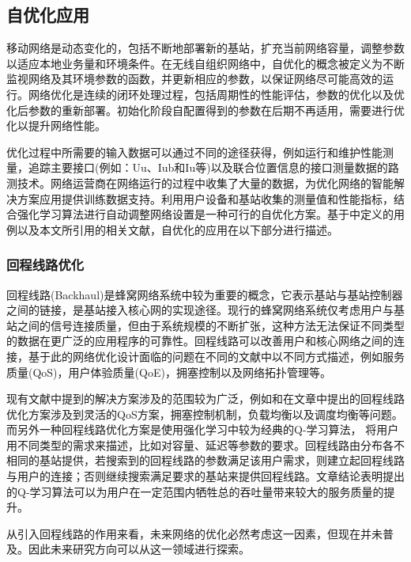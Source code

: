 ﻿\documentclass[11pt,draftclsnofoot,onecolumn,journal,letterpaper]{IEEEtran}
\begin{document}
\subsection{自优化应用}
\label{sec:self-optimization}
移动网络是动态变化的，包括不断地部署新的基站，扩充当前网络容量，调整参数以适应本地业务量和环境条件。在无线自组织网络中，自优化的概念被定义为不断监视网络及其环境参数的函数，并更新相应的参数，以保证网络尽可能高效的运行\cite{Aliu2013}。网络优化是连续的闭环处理过程，包括周期性的性能评估，参数的优化以及优化后参数的重新部署。初始化阶段自配置得到的参数在后期不再适用，需要进行优化以提升网络性能。

优化过程中所需要的输入数据可以通过不同的途径获得，例如运行和维护性能测量，追踪主要接口(例如：Uu、Iub和Iu等)以及联合位置信息的接口测量数据的路测技术。网络运营商在网络运行的过程中收集了大量的数据，为优化网络的智能解决方案应用提供训练数据支持。利用用户设备和基站收集的测量值和性能指标，结合强化学习算法进行自动调整网络设置是一种可行的自优化方案。基于\cite{3gpp.36.902}中定义的用例以及本文所引用的相关文献，自优化的应用在以下部分进行描述。

\subsubsection{回程线路优化}

回程线路(Backhaul)是蜂窝网络系统中较为重要的概念，它表示基站与基站控制器之间的链接，是基站接入核心网的实现途径。现行的蜂窝网络系统仅考虑用户与基站之间的信号连接质量，但由于系统规模的不断扩张，这种方法无法保证不同类型的数据在更广泛的应用程序的可靠性。回程线路可以改善用户和核心网络之间的连接，基于此的网络优化设计面临的问题在不同的文献中以不同方式描述，例如服务质量(QoS)，用户体验质量(QoE)，拥塞控制以及网络拓扑管理等。

现有文献中提到的解决方案涉及的范围较为广泛，例如\cite{Wainio2016}和\cite{Chen2015}在文章中提出的回程线路优化方案涉及到灵活的QoS方案，拥塞控制机制，负载均衡以及调度均衡等问题。而另外一种回程线路优化方案是使用强化学习中较为经典的Q-学习算法，\cite{Jaber2015}\cite{Jaber2016a}\cite{Jaber2016c} 将用户用不同类型的需求来描述，比如对容量、延迟等参数的要求。回程线路由分布各不相同的基站提供，若搜索到的回程线路的参数满足该用户需求，则建立起回程线路与用户的连接；否则继续搜索满足要求的基站来提供回程线路。文章结论表明提出的Q-学习算法可以为用户在一定范围内牺牲总的吞吐量带来较大的服务质量的提升。

从引入回程线路的作用来看，未来网络的优化必然考虑这一因素，但现在并未普及。因此未来研究方向可以从这一领域进行探索。
\end{document}
